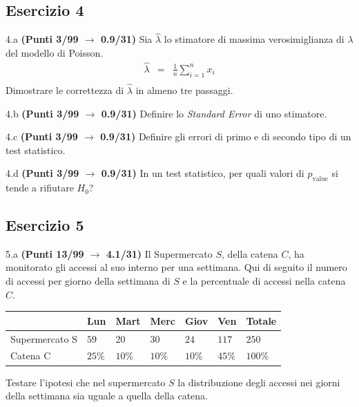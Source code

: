 \documentclass[
  11pt,
]{book}
\theoremstyle{mytheoremstyle}
\theoremstyle{mydefstyle}
\begin{document}
\subsection{Esercizio 4}\label{esercizio-4-9}

4.a \textbf{(Punti 3/99 \(\rightarrow\) 0.9/31)} Sia \(\hat \lambda\) lo stimatore di massima verosimiglianza di \(\lambda\) del modello di Poisson.
\begin{eqnarray*}
  \hat\lambda &=&  \frac 1n\sum_{i=1}^nx_i\\
\end{eqnarray*}
Dimostrare le correttezza di \(\hat\lambda\) in almeno tre passaggi.

4.b \textbf{(Punti 3/99 \(\rightarrow\) 0.9/31)} Definire lo \emph{Standard Error} di uno stimatore.

4.c \textbf{(Punti 3/99 \(\rightarrow\) 0.9/31)} Definire gli errori di primo e di secondo tipo di un test statistico.

4.d \textbf{(Punti 3/99 \(\rightarrow\) 0.9/31)} In un test statistico, per quali valori di \(p_\text{value}\) si tende a rifiutare \(H_0\)?

\subsection{Esercizio 5}\label{esercizio-5-8}

5.a \textbf{(Punti 13/99 \(\rightarrow\) 4.1/31)} Il Supermercato \(S\), della catena \(C\), ha monitorato gli accessi al suo interno per una settimana.
Qui di seguito il numero di accessi per giorno della settimana di \(S\) e la percentuale di accessi nella catena \(C\).

\begin{table}[H]
\centering
\begin{tabular}{lllllll}
\toprule
  & Lun & Mart & Merc & Giov & Ven & Totale\\
\midrule
Supermercato S & $59$ & $20$ & $30$ & $24$ & $117$ & $250$\\
Catena C & $25\%$ & $10\%$ & $10\%$ & $10\%$ & $45\%$ & $100\%$\\
\bottomrule
\end{tabular}
\end{table}

Testare l'ipotesi che nel supermercato \(S\) la distribuzione degli accessi nei giorni della settimana sia uguale a quella della catena.
\end{document}
